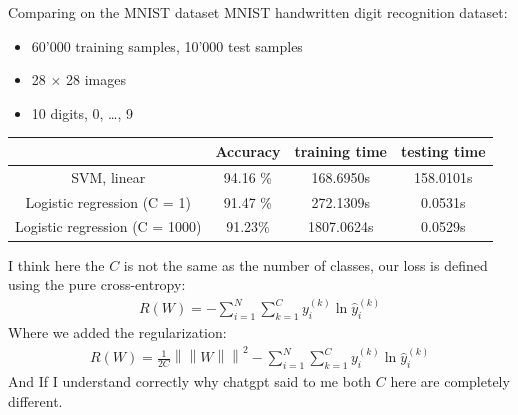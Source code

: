 \begin{parag}{Comparing on the MNIST dataset}
    MNIST handwritten digit recognition dataset:
	\begin{itemize}
		\item 60'000 training samples, 10'000 test samples
		\item 28 $\times$ 28 images
		\item 10 digits, 0, \ldots, 9
	\end{itemize}
	\begin{center}
	\begin{tabular}{|c|c|c|c|}
		\hline
		 & Accuracy & training time & testing time \\
		\hline
		\hline
		SVM, linear & 94.16 \% & 168.6950s & 158.0101s \\
		\hline
		Logistic regression (C = 1) & 91.47 \% & 272.1309s & 0.0531s \\
		\hline
		Logistic regression (C = 1000) & 91.23\% & 1807.0624s & 0.0529s \\
		\hline
	\end{tabular}
	\end{center}
	\begin{framedremark}
	I think here the $C$ is not the same as the number of classes, our loss is defined using the pure cross-entropy:
	\begin{align*} 
		R\left(W\right) = -\sum_{i= 1}^{N}\sum_{k= 1}^{C}y_i^{\left(k\right)}\ln \hat{y}_i^{\left(k\right)}
	\end{align*}
	Where we added the regularization:
	\begin{align*} 
		R\left(W\right) = \frac{1}{2C}\left\|\left\|W\right\|\right\|^2 - \sum_{i= 1}^{N}\sum_{k= 1}^{C}y_i^{\left(k\right)}\ln \hat{y}_i^{\left(k\right)}
	\end{align*}
	And If I understand correctly why chatgpt said to me both $C$ here are completely different.
	\end{framedremark}
	
\end{parag}





	
	
	
	

